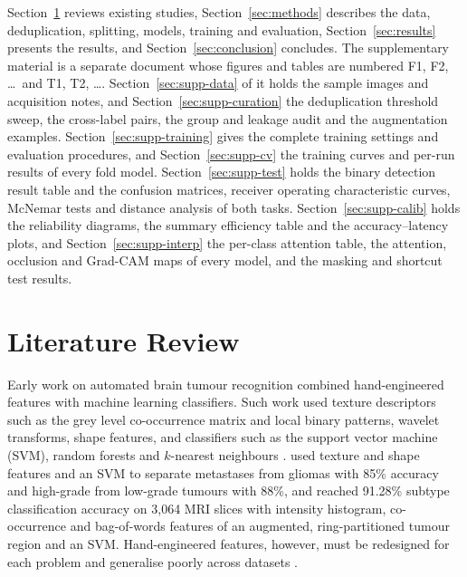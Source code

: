 \documentclass[a4paper,fleqn]{cas-sc}
\begin{document}
Section~\ref{sec:lit} reviews existing studies, Section~\ref{sec:methods} describes the data, deduplication, splitting, models, training and evaluation, Section~\ref{sec:results} presents the results, and Section~\ref{sec:conclusion} concludes. The supplementary material is a separate document whose figures and tables are numbered F1, F2, \dots\ and T1, T2, \dots. Section~\ref{sec:supp-data} of it holds the sample images and acquisition notes, and Section~\ref{sec:supp-curation} the deduplication threshold sweep, the cross-label pairs, the group and leakage audit and the augmentation examples. Section~\ref{sec:supp-training} gives the complete training settings and evaluation procedures, and Section~\ref{sec:supp-cv} the training curves and per-run results of every fold model. Section~\ref{sec:supp-test} holds the binary detection result table and the confusion matrices, receiver operating characteristic curves, McNemar tests and distance analysis of both tasks. Section~\ref{sec:supp-calib} holds the reliability diagrams, the summary efficiency table and the accuracy--latency plots, and Section~\ref{sec:supp-interp} the per-class attention table, the attention, occlusion and Grad-CAM maps of every model, and the masking and shortcut test results.

\section{Literature Review}
\label{sec:lit}

Early work on automated brain tumour recognition combined hand-engineered features with machine learning classifiers. Such work used texture descriptors such as the grey level co-occurrence matrix and local binary patterns, wavelet transforms, shape features, and classifiers such as the support vector machine (SVM), random forests and $k$-nearest neighbours \citep{bauer2013,gordillo2013}. \citet{zacharaki2009} used texture and shape features and an SVM to separate metastases from gliomas with 85\% accuracy and high-grade from low-grade tumours with 88\%, and \citet{cheng2015} reached 91.28\% subtype classification accuracy on 3,064 MRI slices with intensity histogram, co-occurrence and bag-of-words features of an augmented, ring-partitioned tumour region and an SVM. Hand-engineered features, however, must be redesigned for each problem and generalise poorly across datasets \citep{litjens2017}.
\end{document}
